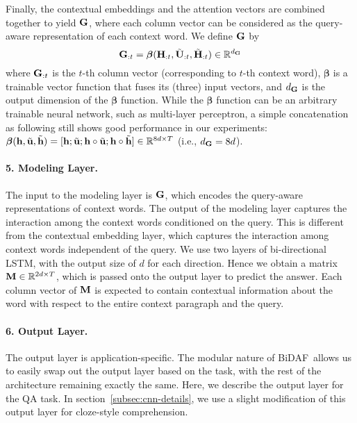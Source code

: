 \documentclass{article} \usepackage{iclr2017_conference,times}
\newcommand{\sysshort}{\mbox{\sc BiDAF}}
\begin{document}
Finally, the contextual embeddings and the attention vectors are combined together to yield ${\bf G}$, where each column vector can be considered as the query-aware representation of each context word.
We define ${\bf G}$ by
\begin{equation}\label{eqn:flow}
{\bf G}_{:t} = {\bm \beta}({\bf H}_{:t}, \tilde{\bf U}_{:t}, \tilde{\bf H}_{:t}) \in \mathbb{R}^{d_{\bf G}}
\end{equation}
where ${\bf G}_{:t}$ is the $t$-th column vector (corresponding to $t$-th context word),
${\bm \beta}$ is a trainable vector function that fuses its (three) input vectors,
and $d_{\bf G}$ is the output dimension of the ${\bm \beta}$ function.
While the ${\bm \beta}$ function can be an arbitrary trainable neural network, such as multi-layer perceptron, 
a simple concatenation as following still shows good performance in our experiments: ${\bm \beta}({\bf h}, \tilde{\bf u}, \tilde{\bf h}) = [{\bf h}; \tilde{\bf u}; {\bf h} \circ \tilde{\bf u}; {\bf h} \circ \tilde{\bf h}] \in \mathbb{R}^{8d \times T}$ (i.e., $d_{\bf G} = 8d$).

\paragraph{5. Modeling Layer.}\label{subsec:main}
The input to the modeling layer is  ${\bf G}$, which encodes the query-aware representations of context words.
The output of the modeling layer captures the interaction among the context words conditioned on the query.
This is different from the contextual embedding layer, which captures the interaction among context words independent of the query. 
We use two layers of bi-directional LSTM, with the output size of $d$ for each direction. 
Hence we obtain a matrix ${\bf M}\in \mathbb{R}^{2d \times T}$, which is passed onto the output layer to predict the answer. 
Each column vector of ${\bf M}$ is expected to contain contextual information about the word with respect to the entire context paragraph and the query.

\paragraph{6. Output Layer.}\label{subsec:out}
The output layer is application-specific. 
The modular nature of \sysshort\ allows us to easily swap out the output layer based on the task, with the rest of the architecture remaining exactly the same. Here, we describe the output layer for the QA task. In section~\ref{subsec:cnn-details}, we use a slight modification of this output layer for cloze-style comprehension.  
\end{document}
